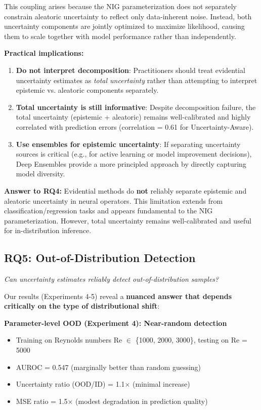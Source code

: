 This coupling arises because the NIG parameterization does not separately constrain aleatoric uncertainty to reflect only data-inherent noise. Instead, both uncertainty components are jointly optimized to maximize likelihood, causing them to scale together with model performance rather than independently.

\textbf{Practical implications:}
\begin{enumerate}
\item \textbf{Do not interpret decomposition}: Practitioners should treat evidential uncertainty estimates as \textit{total uncertainty} rather than attempting to interpret epistemic vs. aleatoric components separately.

\item \textbf{Total uncertainty is still informative}: Despite decomposition failure, the total uncertainty (epistemic + aleatoric) remains well-calibrated and highly correlated with prediction errors (correlation = 0.61 for Uncertainty-Aware).

\item \textbf{Use ensembles for epistemic uncertainty}: If separating uncertainty sources is critical (e.g., for active learning \cite{settles2009active} or model improvement decisions), Deep Ensembles provide a more principled approach by directly capturing model diversity.
\end{enumerate}

\textbf{Answer to RQ4:} Evidential methods do \textbf{not} reliably separate epistemic and aleatoric uncertainty in neural operators. This limitation extends from classification/regression tasks and appears fundamental to the NIG parameterization. However, total uncertainty remains well-calibrated and useful for in-distribution inference.

\subsection{RQ5: Out-of-Distribution Detection}

\textit{Can uncertainty estimates reliably detect out-of-distribution samples?}

Our results (Experiments 4-5) reveal a \textbf{nuanced answer that depends critically on the type of distributional shift}:

\textbf{Parameter-level OOD (Experiment 4): Near-random detection}
\begin{itemize}
\item Training on Reynolds numbers Re $\in$ \{1000, 2000, 3000\}, testing on Re = 5000
\item AUROC = 0.547 (marginally better than random guessing)
\item Uncertainty ratio (OOD/ID) = 1.1× (minimal increase)
\item MSE ratio = 1.5× (modest degradation in prediction quality)
\end{itemize}

